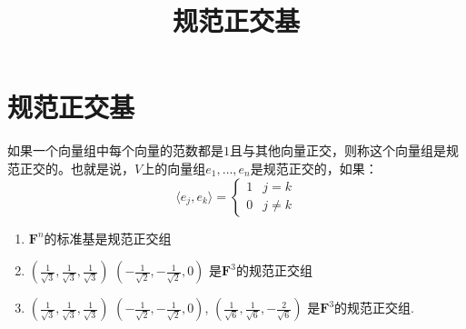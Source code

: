 \documentclass[10pt,a4paper,UTF8]{article}
\title{规范正交基}
\begin{document}
{\heiti\large \maketitle }
\tableofcontents
{}

\section{规范正交基}
\label{sec:org4a7389a}


\begin{definition}
如果一个向量组中每个向量的范数都是\(1\)且与其他向量正交，则称这个向量组是规范正交的。也就是说，\(V\)上的向量组\(e_{1},\ldots ,e_{n}\)是规范正交的，如果：
\begin{equation}
\label{eq:1}
\langle e_{j},e_{k} \rangle =
\begin{cases}
1 & j = k \\
0 & j\neq k
\end{cases}
\end{equation}
\end{definition}
\begin{instance}
\begin{enumerate}
\item \(\mathbf{F}^{n}\)的标准基是规范正交组
\item \((\frac{1}{\sqrt{3}},\frac{1}{\sqrt{3}} ,\frac{1}{\sqrt{3}})\) \((-\frac{1}{\sqrt{2}},-\frac{1}{\sqrt{2}} ,0)\) 是\(\mathbf{F}^{3}\)的规范正交组
\item \((\frac{1}{\sqrt{3}},\frac{1}{\sqrt{3}} ,\frac{1}{\sqrt{3}})\) \((-\frac{1}{\sqrt{2}},-\frac{1}{\sqrt{2}} ,0)\), \((\frac{1}{\sqrt{6}}, \frac{1}{\sqrt{6}}, -\frac{2}{\sqrt{6}})\) 是\(\mathbf{F}^{3}\)的规范正交组.
\end{enumerate}
\end{instance}
\end{document}
